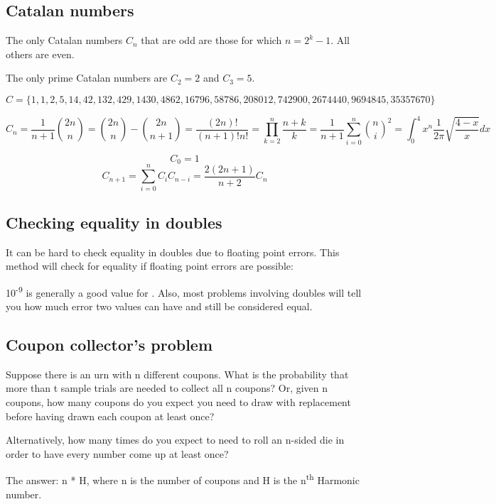 
\subsection*{Catalan numbers}

The only Catalan numbers $C_n$ that are odd are those for which $n=2^k-1$. All others are even.

The only prime Catalan numbers are $C_2=2$ and $C_3=5$.

$C = \{1, 1, 2, 5, 14, 42, 132, 429, 1430, 4862, 16796, 58786, 208012, 742900, 2674440, 9694845, 35357670\}$

$$
    C_n = \frac{1}{n+1}\binom{2n}{n} = \binom{2n}{n} - \binom{2n}{n+1} = \frac{(2n)!}{(n+1)!n!} = \prod_{k=2}^{n} \frac{n+k}{k} = \frac{1}{n+1}\sum_{i=0}^{n}\binom{n}{i}^2 = \int_{0}^{4}x^n\frac{1}{2\pi}\sqrt{\frac{4-x}{x}} dx
$$

$$C_0 = 1$$
$$C_{n+1} = \sum_{i=0}^{n}C_i C_{n-i} = \frac{2(2n + 1)}{n+2}C_n$$


\subsection*{Checking equality in doubles}

It can be hard to check equality in doubles due to floating point errors. This method will check for equality if floating point errors are possible:



10\textsuperscript{-9} is generally a good value for . Also, most problems involving doubles will tell you how much error two values can have and still be considered equal.

\subsection*{Coupon collector's problem}

Suppose there is an urn with n different coupons. What is the probability that more than t sample trials are needed to collect all n coupons? Or, given n coupons, how many coupons do you expect you need to draw with replacement before having drawn each coupon at least once?

Alternatively, how many times do you expect to need to roll an n-sided die in order to have every number come up at least once?

The answer: n * H, where n is the number of coupons and H is the n\textsuperscript{th} Harmonic number.


